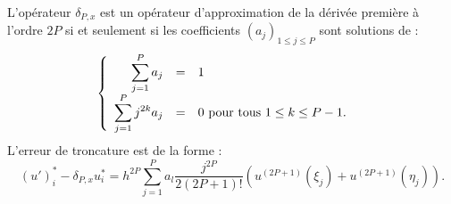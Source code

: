 \begin{theoreme}
L'opérateur $\delta_{P,x}$ est un opérateur d'approximation de la dérivée première à l'ordre $2P$ si et seulement si les coefficients $(a_j)_{1 \leq j \leq P}$ sont solutions de :
\begin{equation}
\left\lbrace
\begin{array}{rcll}
\displaystyle\sum\limits_{j=1}^P a_j & = & 1 & \\
\displaystyle\sum\limits_{j=1}^P j^{2k} a_j & = & 0 \text{ pour tous } 1 \leq k \leq P-1.
\end{array}
\right.
\label{eq:syst_opexplicite_P}
\end{equation}
L'erreur de troncature est de la forme :
\begin{equation}
\left(u' \right)_i^* - \delta_{P,x} u^*_i = h^{2P}\sum_{j=1}^P a_l \dfrac{j^{2P}}{2(2P+1)!} \left( u^{(2P+1)}(\xi_j) + u^{(2P+1)}(\eta_j) \right).
\end{equation}
\label{th:consistance_delta_x_explicite}
\end{theoreme}

